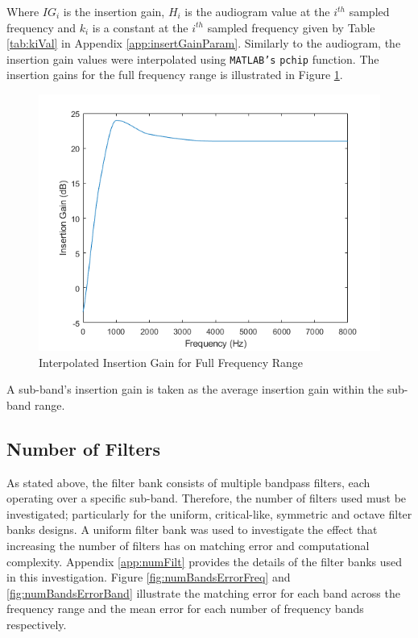\documentclass[11pt,onecolumn]{witseiepaper}
\begin{document}
\noindent Where $IG_i$ is the insertion gain, $H_i$ is the audiogram value at the $i^{th}$ sampled frequency and $k_i$ is a constant at the $i^{th}$ sampled frequency given by Table \ref{tab:kiVal} in Appendix \ref{app:insertGainParam}. Similarly to the audiogram, the insertion gain values were interpolated using \texttt{MATLAB's} \texttt{pchip} function. The insertion gains for the full frequency range is illustrated in Figure \ref{fig:igFreqRange}. 

\begin{figure}[h]
\centering
\includegraphics[width=0.6\linewidth]{igFreqRange.PNG}
\caption{Interpolated Insertion Gain for Full Frequency Range}
\label{fig:igFreqRange}
\end{figure}  

\noindent A sub-band's insertion gain is taken as the average insertion gain within the sub-band range.

\subsection{Number of Filters} 
\label{sec:numFreqBands}

\noindent As stated above, the filter bank consists of multiple bandpass filters, each operating over a specific sub-band. Therefore, the number of filters used must be investigated; particularly for the uniform, critical-like, symmetric and octave filter banks designs. A uniform filter bank was used to investigate the effect that increasing the number of filters has on matching error and computational complexity. Appendix \ref{app:numFilt} provides the details of the filter banks used in this investigation. Figure \ref{fig:numBandsErrorFreq} and \ref{fig:numBandsErrorBand} illustrate the matching error for each band across the frequency range and the mean error for each number of frequency bands respectively.
\end{document}
